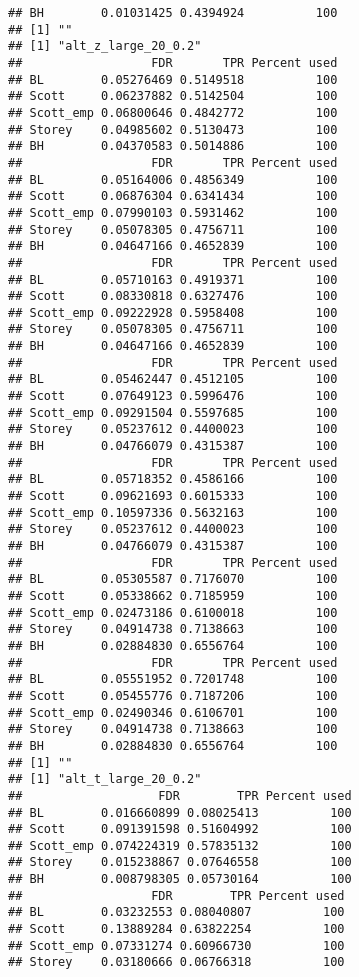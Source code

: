 \documentclass{article}\usepackage[]{graphicx}\usepackage[]{color}
\makeatletter
\newenvironment{kframe}{%
 \def\at@end@of@kframe{}%
 \ifinner\ifhmode%
  \def\at@end@of@kframe{\end{minipage}}%
  \begin{minipage}{\columnwidth}%
 \fi\fi%
 \def\FrameCommand##1{\hskip\@totalleftmargin \hskip-\fboxsep
 \colorbox{shadecolor}{##1}\hskip-\fboxsep
     \hskip-\linewidth \hskip-\@totalleftmargin \hskip\columnwidth}%
 \MakeFramed {\advance\hsize-\width
   \@totalleftmargin\z@ \linewidth\hsize
   \@setminipage}}%
 {\par\unskip\endMakeFramed%
 \at@end@of@kframe}
\newenvironment{knitrout}{}{} %
\makeatother
\begin{document}
\begin{knitrout}
\begin{kframe}
\begin{verbatim}
## BH        0.01031425 0.4394924          100
## [1] ""
## [1] "alt_z_large_20_0.2"
##                  FDR       TPR Percent used
## BL        0.05276469 0.5149518          100
## Scott     0.06237882 0.5142504          100
## Scott_emp 0.06800646 0.4842772          100
## Storey    0.04985602 0.5130473          100
## BH        0.04370583 0.5014886          100
##                  FDR       TPR Percent used
## BL        0.05164006 0.4856349          100
## Scott     0.06876304 0.6341434          100
## Scott_emp 0.07990103 0.5931462          100
## Storey    0.05078305 0.4756711          100
## BH        0.04647166 0.4652839          100
##                  FDR       TPR Percent used
## BL        0.05710163 0.4919371          100
## Scott     0.08330818 0.6327476          100
## Scott_emp 0.09222928 0.5958408          100
## Storey    0.05078305 0.4756711          100
## BH        0.04647166 0.4652839          100
##                  FDR       TPR Percent used
## BL        0.05462447 0.4512105          100
## Scott     0.07649123 0.5996476          100
## Scott_emp 0.09291504 0.5597685          100
## Storey    0.05237612 0.4400023          100
## BH        0.04766079 0.4315387          100
##                  FDR       TPR Percent used
## BL        0.05718352 0.4586166          100
## Scott     0.09621693 0.6015333          100
## Scott_emp 0.10597336 0.5632163          100
## Storey    0.05237612 0.4400023          100
## BH        0.04766079 0.4315387          100
##                  FDR       TPR Percent used
## BL        0.05305587 0.7176070          100
## Scott     0.05338662 0.7185959          100
## Scott_emp 0.02473186 0.6100018          100
## Storey    0.04914738 0.7138663          100
## BH        0.02884830 0.6556764          100
##                  FDR       TPR Percent used
## BL        0.05551952 0.7201748          100
## Scott     0.05455776 0.7187206          100
## Scott_emp 0.02490346 0.6106701          100
## Storey    0.04914738 0.7138663          100
## BH        0.02884830 0.6556764          100
## [1] ""
## [1] "alt_t_large_20_0.2"
##                   FDR        TPR Percent used
## BL        0.016660899 0.08025413          100
## Scott     0.091391598 0.51604992          100
## Scott_emp 0.074224319 0.57835132          100
## Storey    0.015238867 0.07646558          100
## BH        0.008798305 0.05730164          100
##                  FDR        TPR Percent used
## BL        0.03232553 0.08040807          100
## Scott     0.13889284 0.63822254          100
## Scott_emp 0.07331274 0.60966730          100
## Storey    0.03180666 0.06766318          100

\end{verbatim}
\end{kframe}
\end{knitrout}
\end{document}
